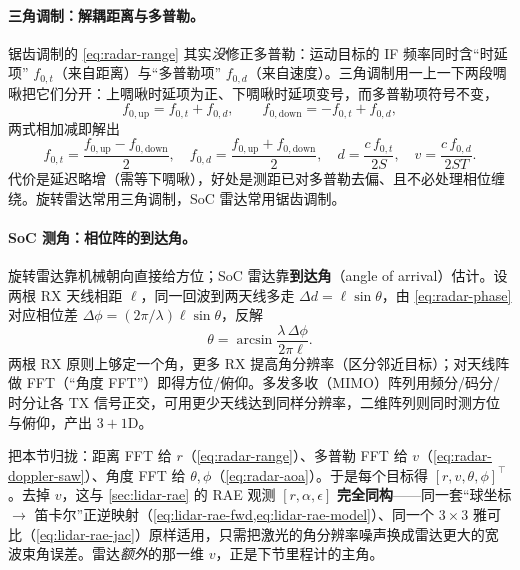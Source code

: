 \paragraph{三角调制：解耦距离与多普勒。}
锯齿调制的 \cref{eq:radar-range} 其实\emph{没}修正多普勒：运动目标的 IF 频率同时含“时延项” $f_{0,t}$（来自距离）与“多普勒项” $f_{0,d}$（来自速度）。三角调制用一上一下两段啁啾把它们分开：上啁啾时延项为正、下啁啾时延项变号，而多普勒项符号不变，
\begin{equation}
  f_{0,\text{up}}=f_{0,t}+f_{0,d},\qquad
  f_{0,\text{down}}=-f_{0,t}+f_{0,d},
  \label{eq:radar-tri}
\end{equation}
两式相加减即解出
\begin{equation}
  f_{0,t}=\frac{f_{0,\text{up}}-f_{0,\text{down}}}{2},\quad
  f_{0,d}=\frac{f_{0,\text{up}}+f_{0,\text{down}}}{2},
  \quad
  d=\frac{c\,f_{0,t}}{2S},\quad
  v=\frac{c\,f_{0,d}}{2ST}.
  \label{eq:radar-tri-solve}
\end{equation}
代价是延迟略增（需等下啁啾），好处是测距已对多普勒去偏、且不必处理相位缠绕。旋转雷达常用三角调制，SoC 雷达常用锯齿调制。

\paragraph{SoC 测角：相位阵的到达角。}
旋转雷达靠机械朝向直接给方位；SoC 雷达靠\textbf{到达角}（angle of arrival）估计。设两根 RX 天线相距 $\ell$，同一回波到两天线多走 $\Delta d=\ell\sin\theta$，由 \cref{eq:radar-phase} 对应相位差 $\Delta\phi=(2\pi/\lambda)\ell\sin\theta$，反解
\begin{equation}
  \theta=\arcsin\frac{\lambda\,\Delta\phi}{2\pi\ell}.
  \label{eq:radar-aoa}
\end{equation}
两根 RX 原则上够定一个角，更多 RX 提高角分辨率（区分邻近目标）；对天线阵做 FFT（“角度 FFT”）即得方位/俯仰。多发多收（MIMO）阵列用频分/码分/时分让各 TX 信号正交，可用更少天线达到同样分辨率，二维阵列则同时测方位与俯仰，产出 $3{+}1$D。

\begin{insight}\label{ins:radar-three-fft}
把本节归拢：距离 FFT 给 $r$（\cref{eq:radar-range}）、多普勒 FFT 给 $v$（\cref{eq:radar-doppler-saw}）、角度 FFT 给 $\theta,\phi$（\cref{eq:radar-aoa}）。于是每个目标得 $[r,v,\theta,\phi]^\top$。去掉 $v$，这与 \cref{sec:lidar-rae} 的 RAE 观测 $[r,\alpha,\epsilon]$ \textbf{完全同构}——同一套“球坐标 $\to$ 笛卡尔”正逆映射（\cref{eq:lidar-rae-fwd,eq:lidar-rae-model}）、同一个 $3\times3$ 雅可比（\cref{eq:lidar-rae-jac}）原样适用，只需把激光的角分辨率噪声换成雷达更大的宽波束角误差。雷达\emph{额外}的那一维 $v$，正是下节里程计的主角。
\end{insight}

